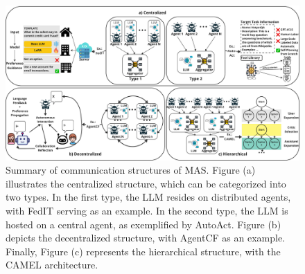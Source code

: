 \documentclass[acmsmall,nonacm]{acmart}
\begin{document}
    \begin{figure}[!h]
        \includegraphics[width=1\textwidth]{image-lib/CommStruct3.pdf}
        \caption{Summary of communication structures of MAS. Figure (a) illustrates the centralized structure, which can be categorized into two types. In the first type, the LLM resides on distributed agents, with FedIT serving as an example. In the second type, the LLM is hosted on a central agent, as exemplified by AutoAct. Figure (b) depicts the decentralized structure, with AgentCF as an example. Finally, Figure (c) represents the hierarchical structure, with the CAMEL architecture.}\label{fig:comm-struct}
    \end{figure}
        
\end{document}
